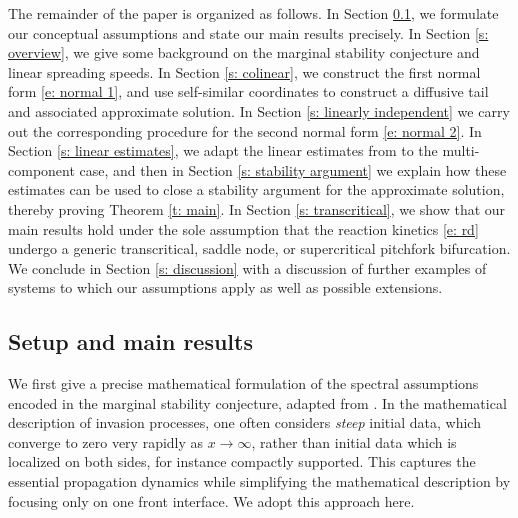 \documentclass[11pt]{article}
\numberwithin{equation}{section}
\numberwithin{prop}{section}
\begin{document}
The remainder of the paper is organized as follows. In Section \ref{s: setup}, we formulate our conceptual assumptions and state our main results precisely. In Section \ref{s: overview}, we give some background on the marginal stability conjecture and linear spreading speeds. In Section \ref{s: colinear}, we construct the first normal form \eqref{e: normal 1}, and use self-similar coordinates to construct a diffusive tail and associated approximate solution. In Section \ref{s: linearly independent} we carry out the corresponding procedure for the second normal form \eqref{e: normal 2}. In Section \ref{s: linear estimates}, we adapt the linear estimates from \cite{SIMA} to the multi-component case, and then in Section \ref{s: stability argument} we explain how these estimates can be used to close a stability argument for the approximate solution, thereby proving Theorem \ref{t: main}. In Section \ref{s: transcritical}, we show that our main results hold under the sole assumption that the reaction kinetics \eqref{e: rd} undergo a generic transcritical, saddle node, or supercritical pitchfork bifurcation. We conclude in Section \ref{s: discussion} with a discussion of further examples of systems to which our assumptions apply as well as possible extensions. 

\subsection{Setup and main results}\label{s: setup}

We first give a precise mathematical formulation of the spectral assumptions encoded in the marginal stability conjecture, adapted from \cite{CAMS}. In the mathematical description of invasion processes, one often considers \emph{steep} initial data, which converge to zero very rapidly as $x \to \infty$, rather than initial data which is localized on both sides, for instance compactly supported. This captures the essential propagation dynamics while simplifying the mathematical description by focusing only on one front interface. We adopt this approach here. 
\end{document}
